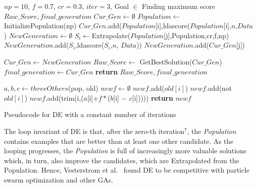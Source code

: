 \documentclass[twocolumn,5p,sort&compress]{elsarticle}
\renewcommand{\algorithmicrequire}{\textbf{Input:}}
\renewcommand{\algorithmicensure}{\textbf{Output:}}
\theoremstyle{break}
\begin{document}
\renewcommand{\algorithmicrequire}{\textbf{Input:}}
\renewcommand{\algorithmicensure}{\textbf{Output:}}
\begin{algorithm}
  
    \begin{algorithmic}[1]
    \Require $np=10$, $f=0.7$, $cr=0.3$, $iter=3$, Goal $\in$ Finding maximum score
    \Ensure $Raw\_Score, final\_generation$
        \State  $Cur\_Gen \leftarrow \emptyset$
        \State $Population \leftarrow $InitializePopulation(np)
            \State $Cur\_Gen$.add($Population$[i],ldascore($Population$[i],$n$,$Data$)
        \EndFor
            \State $NewGeneration \leftarrow \emptyset$
                \State $S_i \leftarrow $Extrapolate($Population$[j],Population,cr,f,np)
                    \State $NewGeneration$.add($S_i$,ldascore($S_i$,$n$, $Data$))
                \Else
                    \State $NewGeneration$.add($Cur\_Gen$[j])
                \EndIf
            
            \EndFor
            \State  $Cur\_Gen \leftarrow NewGeneration$
        \EndFor
        \State $Raw\_Score \leftarrow$ GetBestSolution($Cur\_Gen$)
        \State  $final\_generation \leftarrow Cur\_Gen$
        \State \textbf{return} $Raw\_Score, final\_generation$
    \EndFunction

        \State $a,b,c \leftarrow threeOthers$(pop, old)
        \State $newf \leftarrow \emptyset$
                \State $newf$.add($old[i]$)
            \Else
                    \State $newf$.add(not $old[i]$)
                \Else 
                    \State $newf$.add(trim(i,($a$[i]+$f\ast$($b$[i] $-$ $c$[i]))))
                \EndIf
            \EndIf
        \EndFor
        \State \textbf{return} $newf$ 
    \EndFunction
    \caption{Pseudocode for DE with a constant number of iterations}
    \end{algorithmic}
\end{algorithm}

The loop invariant of DE is that, after the zero-th iteration$^7$, the \textit{Population}
contains examples that are better than at least one other candidate.
As the looping progresses, the \textit{Population} is full of increasingly more valuable solutions
which, in turn, also improve the candidates, which are Extrapolated from the Population.
Hence, Vesterstrom et al.~\cite{vesterstrom2004comparative} found DE to be
competitive with particle swarm optimization and other GAs.
\end{document}
